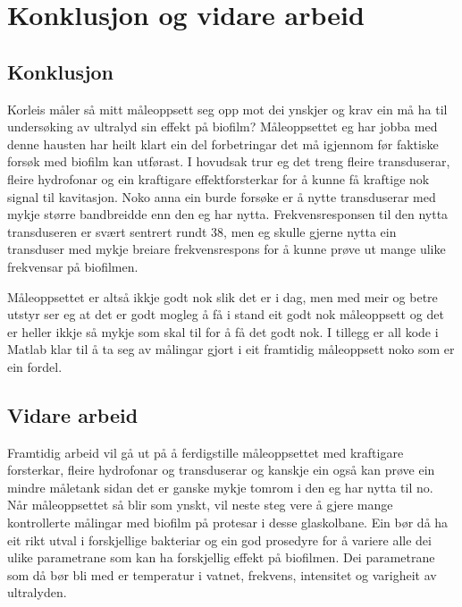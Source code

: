 \section{Konklusjon og vidare arbeid}
\subsection{Konklusjon}
Korleis måler så mitt måleoppsett seg opp mot dei ynskjer og krav ein må ha til undersøking av ultralyd sin effekt på biofilm? Måleoppsettet eg har jobba med denne hausten har heilt klart ein del forbetringar det må igjennom før faktiske forsøk med biofilm kan utførast. I hovudsak trur eg det treng fleire transduserar, fleire hydrofonar og ein kraftigare effektforsterkar for å kunne få kraftige nok signal til kavitasjon. Noko anna ein burde forsøke er å nytte transduserar med mykje større bandbreidde enn den eg har nytta. Frekvensresponsen til den nytta transduseren er svært sentrert rundt \unit{38}{\kilo\hertz}, men eg skulle gjerne nytta ein transduser med mykje breiare frekvensrespons for å kunne prøve ut mange ulike frekvensar på biofilmen. 

Måleoppsettet er altså ikkje godt nok slik det er i dag, men med meir og betre utstyr ser eg at det er godt mogleg å få i stand eit godt nok måleoppsett og det er heller ikkje så mykje som skal til for å få det godt nok. I tillegg er all kode i Matlab klar til å ta seg av målingar gjort i eit framtidig måleoppsett noko som er ein fordel.

\subsection{Vidare arbeid}
Framtidig arbeid vil gå ut på å ferdigstille måleoppsettet med kraftigare forsterkar, fleire hydrofonar og transduserar og kanskje ein også kan prøve ein mindre måletank sidan det er ganske mykje tomrom i den eg har nytta til no. Når måleoppsettet så blir som ynskt, vil neste steg vere å gjere mange kontrollerte målingar med biofilm på protesar i desse glaskolbane. Ein bør då ha eit rikt utval i forskjellige bakteriar og ein god prosedyre for å variere alle dei ulike parametrane som kan ha forskjellig effekt på biofilmen. Dei parametrane som då bør bli med er temperatur i vatnet, frekvens, intensitet og varigheit av ultralyden. 
